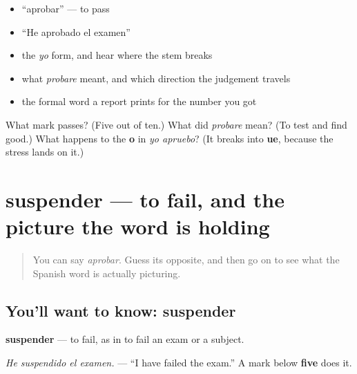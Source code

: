\begin{itemize}
\raggedright
  \item \textquotedblleft{}aprobar\textquotedblright{} — to pass
  \item \textquotedblleft{}He aprobado el examen\textquotedblright{}
  \item the \emph{yo} form, and hear where the stem breaks
  \item what \emph{probare} meant, and which direction the judgement travels
  \item the formal word a report prints for the number you got
\end{itemize}

\begin{tcolorbox}[breakable,colback=teal!4,colframe=teal!35!black,title={Before you move on}]
What mark passes? (Five out of ten.) What did \emph{probare} mean? (To test and find good.) What happens to the \textbf{o} in \emph{yo apruebo}? (It breaks into \textbf{ue}, because the stress lands on it.)
\end{tcolorbox}
\section[suspender]{suspender — to fail, and the picture the word is holding}

\label{lesson:ES-C429-suspender}



\begin{quote}
You can say \emph{aprobar}. Guess its opposite, and then go on to see what the Spanish word is actually picturing.
\end{quote}

\subsection*{You'll want to know: suspender}
\textbf{suspender} — to fail, as in to fail an exam or a subject.

\emph{He suspendido el examen.} — \textquotedblleft{}I have failed the exam.\textquotedblright{} A mark below \textbf{five} does it.

